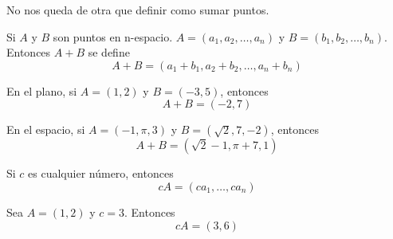 No nos queda de otra que definir como sumar puntos.

\begin{definition}
    Si $A$ y $B$ son puntos en n-espacio. $A=(a_{1},a_{2},\ldots,a_{n})$ y $B=(b_{1},b_{2},\ldots,b_{n})$. Entonces $A+B$
    se define
    $$ A + B = (a_{1} + b_{1}, a_{2} + b_{2}, \ldots, a_{n} + b_{n}) $$
\end{definition}

\begin{myExample}
    En el plano, si $A=(1,2)$ y $B=(-3,5)$, entonces
    $$ A + B = (-2,7) $$
\end{myExample}

\begin{myExample}
    En el espacio, si $A=(-1,\pi,3)$ y $B=(\sqrt{2},7,-2)$, entonces
    $$ A + B = (\sqrt{2} - 1, \pi + 7, 1) $$
\end{myExample}

\begin{definition}
    Si $c$ es cualquier número, entonces
    $$ cA = (ca_{1},\ldots,ca_{n}) $$
\end{definition}

\begin{myExample}
    Sea $A=(1,2)$ y $c=3$. Entonces
    $$cA = (3,6)$$
\end{myExample}

\begin{figure}[!ht]%
    \centering
    \qquad
    \label{fig:example}%
\end{figure}


